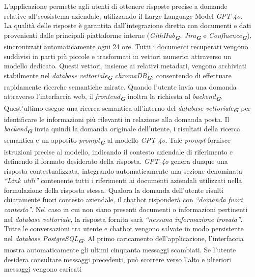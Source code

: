 L’applicazione permette agli utenti di ottenere risposte precise a domande relative all’ecosistema 
aziendale, utilizzando il Large Language Model \emph{GPT-4o}. La 
qualità delle risposte è garantita dall'integrazione diretta con documenti e dati provenienti dalle 
principali piattaforme interne (\emph{GithHub}\textsubscript{\textbf{\textit{G}}}, 
\emph{Jira}\textsubscript{\textbf{\textit{G}}} e \emph{Confluence}\textsubscript{\textbf{\textit{G}}}), 
sincronizzati automaticamente ogni 24 ore.
Tutti i documenti recuperati vengono suddivisi in parti più piccole e trasformati in vettori 
numerici attraverso un modello dedicato. Questi vettori, insieme ai relativi metadati, vengono 
archiviati stabilmente nel \emph{database vettoriale}\textsubscript{\textbf{\textit{G}}} 
\emph{chromaDB}\textsubscript{\textbf{\textit{G}}}, consentendo di effettuare rapidamente ricerche 
semantiche mirate.
Quando l’utente invia una domanda attraverso l’interfaccia web, il \emph{frontend}\textsubscript{\textbf{\textit{G}}} 
inoltra la richiesta al \emph{backend}\textsubscript{\textbf{\textit{G}}}. Quest’ultimo esegue una 
ricerca semantica all'interno del \emph{database vettoriale}\textsubscript{\textbf{\textit{G}}} per 
identificare le informazioni più rilevanti in relazione alla domanda posta. Il 
\emph{backend}\textsubscript{\textbf{\textit{G}}} invia quindi la domanda originale dell’utente, i 
risultati della ricerca semantica e un apposito \emph{prompt}\textsubscript{\textbf{\textit{G}}} al 
modello \emph{GPT-4o}. Tale \emph{prompt} 
fornisce istruzioni precise al modello, indicando il contesto aziendale di riferimento e definendo il 
formato desiderato della risposta.
\emph{GPT-4o} genera dunque una risposta contestualizzata, 
integrando automaticamente una sezione denominata \emph{“Link utili”} contenente tutti i riferimenti 
ai documenti aziendali utilizzati nella formulazione della risposta stessa. Qualora la domanda 
dell'utente risulti chiaramente fuori contesto aziendale, il chatbot risponderà con 
\emph{“domanda fuori contesto”}. Nel caso in cui non siano presenti documenti o informazioni pertinenti 
nel \emph{database vettoriale}, la risposta fornita sarà 
\emph{“nessuna informazione trovata”}.
Tutte le conversazioni tra utente e chatbot vengono salvate in modo persistente nel 
\emph{database PostgreSQL}\textsubscript{\textbf{\textit{G}}}. Al primo caricamento dell’applicazione, 
l'interfaccia mostra automaticamente gli ultimi cinquanta messaggi scambiati. Se l'utente desidera 
consultare messaggi precedenti, può scorrere verso l'alto e ulteriori messaggi vengono caricati 
